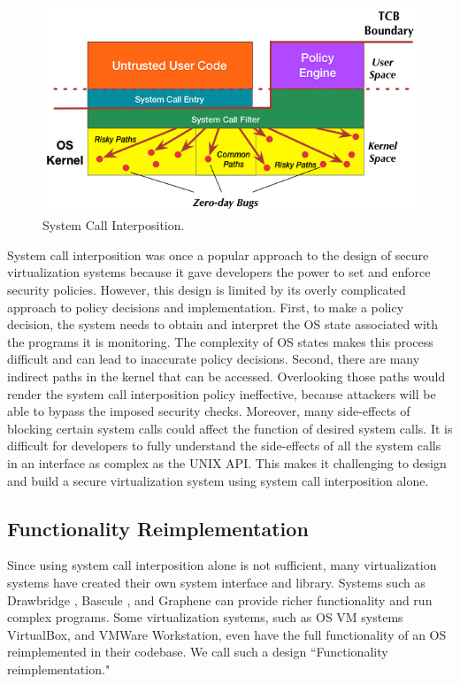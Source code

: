 \begin{figure}%
\centering
\includegraphics[width=1.0\columnwidth]{diagram/Virtualization_Design_Model_03.png}
\caption{\small System Call Interposition.}
\label{fig:design_system_call_interposition}
\end{figure}

System call interposition was once a popular approach to the design of secure
virtualization systems because it gave developers the power to set and enforce
security policies.
However, this design
is limited by its overly complicated approach to policy decisions and implementation.
First, to make a policy decision, the system needs to
obtain and interpret the OS state associated with the programs it is monitoring.
The complexity of OS states makes this process difficult and can lead to
inaccurate policy decisions.
Second, there are many indirect paths in the kernel that can be accessed.
Overlooking those paths would render the
system call interposition policy ineffective, because attackers will be able to
bypass the imposed security checks. Moreover, many side-effects of blocking
certain system calls could affect the function of desired system calls.
It is difficult for developers to fully understand the side-effects of all the
system calls in an interface as complex as the UNIX API. This makes
it challenging to design and build a secure virtualization system using
system call interposition alone.

\subsection{Functionality Reimplementation}
Since using system call interposition alone is not sufficient,
many virtualization systems have created their own system
interface and library. Systems such as  Drawbridge \cite{Drawbridge-11},
 Bascule \cite{Bascule}, and Graphene \cite{Graphene-14} can
provide richer functionality and run complex programs. Some virtualization
systems, such as OS VM systems VirtualBox, and VMWare Workstation, even have the
full functionality of an OS reimplemented in their codebase. We call such a design
``Functionality reimplementation."


